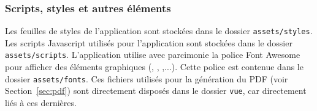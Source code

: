 \subsubsection{Scripts, styles et autres éléments}
Les feuilles de styles de l'application sont stockées dans le dossier \texttt{assets/styles}.
Les scripts Javascript utilisés pour l'application sont stockées dans le dossier \texttt{assets/scripts}.
L'application utilise avec parcimonie la police Font Awesome pour afficher des éléments graphiques (\faChevronDown, \faUser, \faRemove,...). Cette police est contenue dans le dossier \texttt{assets/fonts}.
Ces fichiers utilisés pour la génération du PDF (voir Section~\ref{sec:pdf}) sont directement disposés dans le dossier \texttt{vue}, car directement liés à ces dernières.

